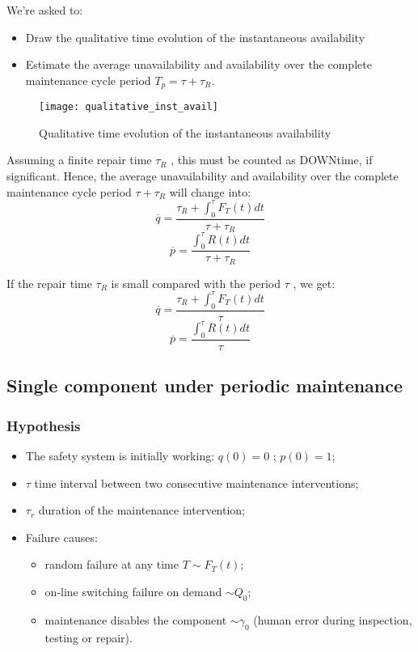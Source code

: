 We're asked to:
\begin{itemize}
    \item Draw the qualitative time evolution of the instantaneous availability
    \item Estimate the average unavailability and availability over the complete
    maintenance cycle period $T_p = \tau + \tau_R$.
\end{itemize}

\begin{figure}[!htp]
    \centering
    \texttt{[image: qualitative\_inst\_avail]}
    \caption{Qualitative time evolution of the instantaneous availability}
\end{figure}

Assuming a finite repair time $\tau_R$ , this must be counted as DOWNtime, if
significant. Hence, the average unavailability and availability over the
complete maintenance cycle period $\tau+\tau_R$ will change into:
\begin{equation*}
    \overline{q} = \frac{\tau_R + \int_0^\tau F_T(t)dt}{\tau+\tau_R}
\end{equation*}
\begin{equation*}
    \overline{p} = \frac{\int_0^\tau R(t)dt}{\tau+\tau_R}
\end{equation*}

If the repair time $\tau_R$ is small compared with the period $\tau$ , we get:
\begin{equation*}
    \overline{q} = \frac{\tau_R + \int_0^\tau F_T(t)dt}{\tau}
\end{equation*}
\begin{equation*}
    \overline{p} = \frac{\int_0^\tau R(t)dt}{\tau}
\end{equation*}

\subsection{Single component under periodic maintenance}
\subsubsection*{Hypothesis}
\begin{itemize}
    \item The safety system is initially working: $q(0) = 0$ ; $p(0) = 1$;
    \item $\tau$ time interval between two consecutive maintenance interventions;
    \item $\tau_r$ duration of the maintenance intervention;
    \item Failure causes:
    \begin{itemize}
        \item random failure at any time $T \sim F_T(t)$;
        \item on-line switching failure on demand $\sim Q_0$;
        \item maintenance disables the component $\sim \gamma_0$ (human error during inspection, testing or repair).
    \end{itemize}
\end{itemize}

